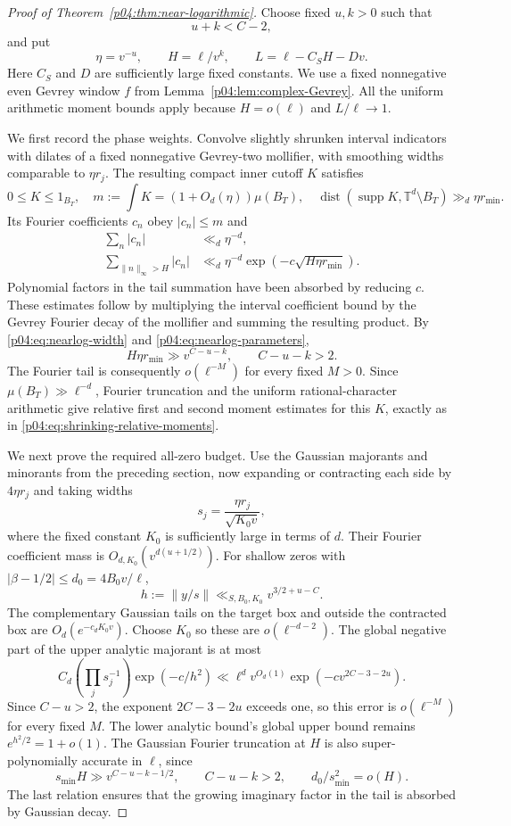 \documentclass[11pt,letterpaper]{article}
\theoremstyle{definition}
\theoremstyle{remark}
\newcommand{\1}{\mathbf 1}
\begin{document}
\begin{proof}[Proof of Theorem~\ref{p04:thm:near-logarithmic}]
Choose fixed $u,k>0$ such that
\begin{equation}\label{p04:eq:nearlog-parameters}
 u+k<C-2,
\end{equation}
and put
\[
 \eta=v^{-u},\qquad H=\ell/v^k,
 \qquad L=\ell-C_SH-Dv.
\]
Here $C_S$ and $D$ are sufficiently large fixed constants.
We use a fixed nonnegative even Gevrey window $f$ from
Lemma~\ref{p04:lem:complex-Gevrey}. All the uniform arithmetic moment
bounds apply because $H=o(\ell)$ and $L/\ell\to1$.

We first record the phase weights. Convolve slightly shrunken
interval indicators with dilates of a fixed nonnegative Gevrey-two
mollifier, with smoothing widths comparable to $\eta r_j$.
The resulting compact inner cutoff $K$ satisfies
\[
 0\le K\le1_{B_T},\quad
 m:=\int K=(1+O_d(\eta))\mu(B_T),\quad
 \operatorname{dist}(\operatorname{supp}K,\mathbb T^d\setminus B_T)
                      \gg_d\eta r_{\min}.
\]
Its Fourier coefficients $c_n$ obey $|c_n|\le m$ and
\begin{align*}
 \sum_n|c_n|&\ll_d\eta^{-d},\\
 \sum_{\|n\|_\infty>H}|c_n|
   &\ll_d\eta^{-d}\exp(-c\sqrt{H\eta r_{\min}}).
\end{align*}
Polynomial factors in the tail summation have been absorbed by
reducing $c$.  These estimates follow by multiplying the interval
coefficient bound by the Gevrey Fourier decay of the mollifier and
summing the resulting product. By \eqref{p04:eq:nearlog-width} and
\eqref{p04:eq:nearlog-parameters},
\[
 H\eta r_{\min}\gg v^{C-u-k},\qquad C-u-k>2.
\]
The Fourier tail is consequently $o(\ell^{-M})$ for every fixed
$M>0$. Since $\mu(B_T)\gg\ell^{-d}$, Fourier truncation and the
uniform rational-character arithmetic give relative first and
second moment estimates for this $K$, exactly as in
\eqref{p04:eq:shrinking-relative-moments}.

We next prove the required all-zero budget. Use the Gaussian
majorants and minorants from the preceding section, now expanding
or contracting each side by $4\eta r_j$ and taking widths
\[
 s_j=\frac{\eta r_j}{\sqrt{K_0v}},
\]
where the fixed constant $K_0$ is sufficiently large in terms of
$d$. Their Fourier coefficient mass is
$O_{d,K_0}(v^{d(u+1/2)})$. For shallow zeros with
$|\beta-1/2|\le d_0=4B_0v/\ell$,
\[
 h:=\|y/s\|\ll_{S,B_0,K_0}v^{3/2+u-C}.
\]
The complementary Gaussian tails on the target box and outside the
contracted box are $O_d(e^{-c_dK_0v})$. Choose $K_0$ so these are
$o(\ell^{-d-2})$. The global negative part of the upper analytic
majorant is at most
\[
 C_d\left(\prod_js_j^{-1}\right)
       \exp(-c/h^2)
 \ll\ell^d v^{O_d(1)}
       \exp(-c v^{2C-3-2u}).
\]
Since $C-u>2$, the exponent $2C-3-2u$ exceeds one, so this error
is $o(\ell^{-M})$ for every fixed $M$. The lower analytic bound's global
upper bound remains $e^{h^2/2}=1+o(1)$.
The Gaussian Fourier truncation at $H$ is also super-polynomially
accurate in $\ell$, since
\[
 s_{\min}H\gg v^{C-u-k-1/2},\qquad C-u-k>2,
 \qquad d_0/s_{\min}^2=o(H).
\]
The last relation ensures that the growing imaginary factor in
the tail is absorbed by Gaussian decay.


\end{proof}
\end{document}
